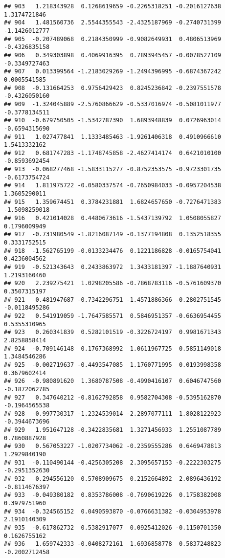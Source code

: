 \documentclass[
]{article}
\begin{document}
\begin{verbatim}
## 903   1.218343928  0.1268619659 -0.2265318251 -0.2016127638  1.3174721846
## 904   1.481560736  2.5544355543 -2.4325187969 -0.2740731399 -1.1426012777
## 905  -0.207489068  0.2184350999 -0.9082649931  0.4806513969 -0.4326835158
## 906   0.349303898  0.4069916395  0.7893945457 -0.0078527109 -0.3349727463
## 907   0.013399564 -1.2183029269 -1.2494396995 -0.6874367242  0.0005541585
## 908  -0.131664253  0.9756429423  0.8245236842 -0.2397551578 -0.4326050160
## 909  -1.324045889 -2.5760866629 -0.5337016974 -0.5081011977 -0.3778134511
## 910  -0.679750505 -1.5342787390  1.6893948839  0.0726963014 -0.6594315690
## 911   1.027477841  1.1333485463 -1.9261406318  0.4910966610  1.5413332162
## 912   0.681747283 -1.1748745858 -2.4627414174  0.6421010100 -0.8593692454
## 913  -0.068277468 -1.5833115277 -0.8752353575 -0.9723301735 -0.6173754724
## 914   1.811975722 -0.0580337574 -0.7650984033 -0.0957204538  1.3605290011
## 915   1.359674451  0.3784231881  1.6824657650 -0.7276471383 -1.5098259018
## 916   0.421014028  0.4480673616 -1.5437139792  1.0508055827  0.1796009949
## 917  -0.731980549 -1.8216087149 -0.1377194808  0.1352518355  0.3331752515
## 918  -1.562765199 -0.0133234476  0.1221186828 -0.0165754041  0.4236004562
## 919  -0.521343643  0.2433863972  1.3433181397 -1.1887640931  1.2193160460
## 920   2.239275421  1.0298205586 -0.7868783116 -0.5761609370  0.3507315197
## 921  -0.481947687 -0.7342296751 -1.4571886366 -0.2802751545 -0.0118495286
## 922   0.541919059 -1.7647585571  0.5846951357 -0.6636954455  0.5355310965
## 923   0.260341839  0.5282101519 -0.3226724197  0.9981671343  2.8258858414
## 924  -0.709146148  0.1767368992  1.0611967725  0.5851149018  1.3484546286
## 925  -0.002719637 -0.4493547085  1.1760771995  0.0193998358  0.3679602414
## 926  -0.980891620  1.3680787508 -0.4990416107  0.6046747560 -0.1872062785
## 927   0.347640212 -0.8162792858  0.9582704308 -0.5395162870 -0.1964565538
## 928  -0.997730317 -1.2324539014 -2.2897077111  1.8028122923 -0.3944673696
## 929   1.951647128 -0.3422835681  1.3271456933  1.2551087789  0.7860887928
## 930   0.567053227 -1.0207734062 -0.2359555286  0.6469478813  1.2929840190
## 931  -0.110490144 -0.4256305208  2.3095657153 -0.2222303275 -0.2951352630
## 932  -0.294556120 -0.5708909675  0.2152664892  2.0896436192 -0.8114676397
## 933  -0.049380182  0.8353786008 -0.7690619226  0.1758382008  0.3979751960
## 934  -0.324565152  0.0490593870 -0.0766631382 -0.0304953978  2.1910140309
## 935  -0.617862732  0.5382917077  0.0925412026 -0.1150701350  0.1626755162
## 936   1.659742333 -0.0408272161  1.6936858778  0.5837248823 -0.2002712458

\end{verbatim}
\end{document}
